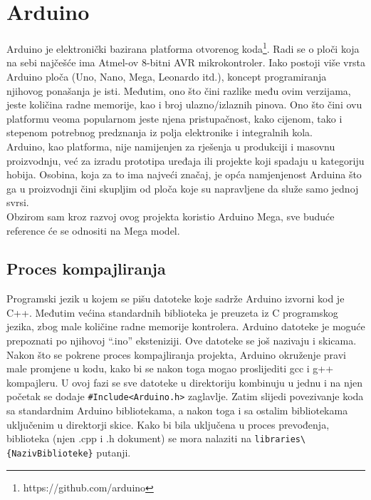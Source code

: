 \documentclass[../Document.tex]{subfiles}
\begin{document}
\section{Arduino}
Arduino je elektronički bazirana platforma otvorenog koda\footnote{https://github.com/arduino}. Radi se o ploči koja na sebi najčešće ima Atmel-ov 8-bitni AVR mikrokontroler. Iako postoji više vrsta Arduino ploča (Uno, Nano, Mega, Leonardo itd.), koncept programiranja njihovog ponašanja je isti. Međutim, ono što čini razlike među ovim verzijama, jeste količina radne memorije, kao i broj ulazno/izlaznih pinova. Ono što čini ovu platformu veoma popularnom jeste njena pristupačnost, kako cijenom, tako i stepenom potrebnog predznanja iz polja elektronike i integralnih kola.\\

Arduino, kao platforma, nije namijenjen za rješenja u produkciji i masovnu proizvodnju, već za izradu prototipa uređaja ili projekte koji spadaju u kategoriju hobija. Osobina, koja za to ima najveći značaj, je opća namjenjenost Arduina što ga u proizvodnji čini skupljim od ploča koje su napravljene da služe samo jednoj svrsi.\\

\noindent Obzirom sam kroz razvoj ovog projekta koristio Arduino Mega, sve buduće reference će se odnositi na Mega model.

\subsection{Proces kompajliranja}\label{kompajliranje}
Programski jezik u kojem se pišu datoteke koje sadrže Arduino izvorni kod je C++. Međutim većina standardnih biblioteka je preuzeta iz C programskog jezika, zbog male količine radne memorije kontrolera. Arduino datoteke je moguće prepoznati po njihovoj ``.ino'' eksteniziji. Ove datoteke se još nazivaju i skicama.\\

Nakon što se pokrene proces kompajliranja projekta, Arduino okruženje pravi male promjene u kodu, kako bi se nakon toga mogao proslijediti gcc i g++ kompajleru. U ovoj fazi se sve datoteke u direktoriju kombinuju u jednu i na njen početak se dodaje \verb|#Include<Arduino.h>| zaglavlje. Zatim slijedi povezivanje koda sa standardnim Arduino bibliotekama, a nakon toga i sa ostalim bibliotekama uključenim u direktorji skice. Kako bi bila uključena u proces prevođenja, biblioteka (njen .cpp i .h dokument) se mora nalaziti na \verb|libraries\{NazivBiblioteke}| putanji.\\
\end{document}
